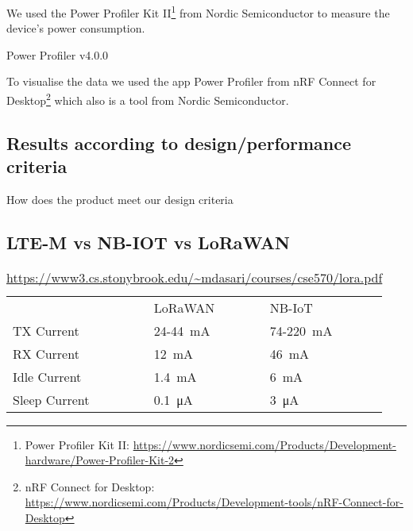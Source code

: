 We used the Power Profiler Kit II\footnote{Power Profiler Kit II: \url{https://www.nordicsemi.com/Products/Development-hardware/Power-Profiler-Kit-2}} from Nordic Semiconductor to measure the device's power consumption.

Power Profiler v4.0.0

To visualise the data we used the app Power Profiler from nRF Connect for Desktop\footnote{nRF Connect for Desktop: \url{https://www.nordicsemi.com/Products/Development-tools/nRF-Connect-for-Desktop}} which also is a tool from Nordic Semiconductor.

\subsection{Results according to design/performance criteria}
How does the product meet our design criteria

\subsection{LTE-M vs NB-IOT vs LoRaWAN}

\begin{table}[H]
\centering
\caption{\url{https://www3.cs.stonybrook.edu/~mdasari/courses/cse570/lora.pdf}}
\begin{tabular}{lll}
              & LoRaWAN    & NB-IoT    \\
TX Current    & 24-\SI{44}{\milli\ampere} & 74-\SI{220}{\milli\ampere} \\
RX Current    & \SI{12}{\milli\ampere}     & \SI{46}{\milli\ampere}     \\
Idle Current  & \SI{1.4}{\milli\ampere}     & \SI{6}{\milli\ampere}      \\
Sleep Current & \SI{0.1}{\micro\ampere} & \SI{3}{\micro\ampere}
\end{tabular}
\end{table}

